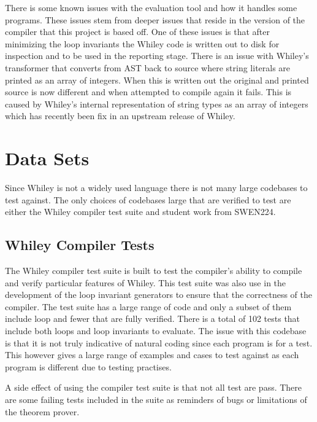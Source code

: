 There is some known issues with the evaluation tool and how it handles some
programs.
These issues stem from deeper issues that reside in the version of the compiler
that this project is based off.
One of these issues is that after minimizing the loop invariants the Whiley
code is written out to disk for inspection and to be used in the reporting
stage. There is an issue with Whiley's transformer that converts from AST
back to source where string literals are printed as an array of integers.
When this is written out the original and printed source is now different
and when attempted to compile again it fails.
This is caused by Whiley's internal representation of string types as an array
of integers which has recently been fix in an upstream release of Whiley.

\section{Data Sets}

Since Whiley is not a widely used language there is not many large codebases
to test against.
The only choices of codebases large that are verified to test are either the
Whiley compiler test suite and student work from SWEN224.

\subsection{Whiley Compiler Tests}

The Whiley compiler test suite is built to test the compiler's ability to
compile and verify particular features of Whiley.
This test suite was also use in the development of the loop invariant
generators to ensure that the correctness of the compiler.
The test suite has a large range of code and only a subset of them include
loop and fewer that are fully verified.
There is a total of 102 tests that include both loops and loop invariants to
evaluate.
The issue with this codebase is that it is not truly indicative of
natural coding since each program is for a test.
This however gives a large range of examples and cases to test against
as each program is different due to testing practises.

A side effect of using the compiler test suite is that not all test
are pass.
There are some failing tests included in the suite as
reminders of bugs or limitations of the theorem prover.


